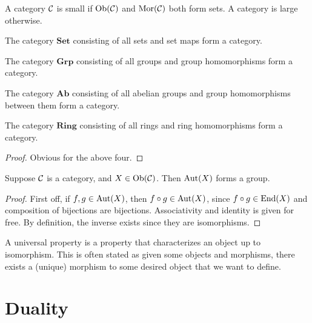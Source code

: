 \begin{definition}
    A category \(\mathcal{C}\) is small
    if \(\operatorname{Ob}(\mathcal{C})\) and \(\operatorname{Mor}(\mathcal{C})\) both form sets.
    A category is large otherwise.
\end{definition}

\begin{proposition}
    The category \(\mathbf{Set}\) consisting of all sets and set maps form a category.
\end{proposition}
\begin{proposition}
    The category \(\mathbf{Grp}\) consisting of all groups and group homomorphisms
    form a category.
\end{proposition}
\begin{proposition}
    The category \(\mathbf{Ab}\) consisting of all abelian groups
    and group homomorphisms between them form a category.
\end{proposition}
\begin{proposition}
    The category \(\mathbf{Ring}\) consisting of all rings and ring homomorphisms
    form a category.
\end{proposition}
\begin{proof}
    Obvious for the above four.
\end{proof}

\begin{theorem}
    Suppose \(\mathcal{C}\) is a category, and \(X \in \operatorname{Ob}(\mathcal{C})\).
    Then \(\operatorname{Aut}(X)\) forms a group.
\end{theorem}
\begin{proof}
    First off, if \(f,g \in \operatorname{Aut}(X)\),
    then \(f \circ g \in \operatorname{Aut}(X)\),
    since \(f \circ g \in \operatorname{End}(X)\) and composition of bijections are bijections.
    Associativity and identity is given for free.
    By definition, the inverse exists since they are isomorphisms.
\end{proof}

\begin{definition}
    A universal property is a property
    that characterizes an object up to isomorphism.
    This is often stated as given some objects and morphisms,
    there exists a (unique) morphism to some desired object that we want to define.
\end{definition}


\section{Duality}

